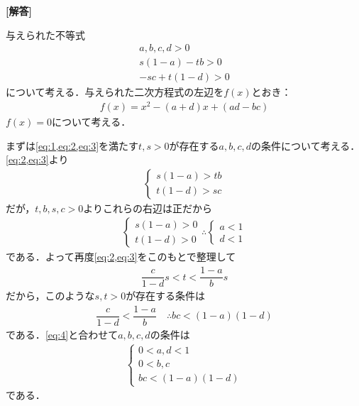 \documentclass[../../main.tex]{subfiles}
\begin{document}
\begin{oframed}
  
\end{oframed}

{\bf [解答]}

与えられた不等式
\begin{align}
  a,b,c,d > 0 \label{eq:1}\\
  s(1-a)-tb>0 \label{eq:2}\\
  -sc+t(1-d)>0 \label{eq:3}
\end{align}
について考える．与えられた二次方程式の左辺を$f(x)$とおき：
\begin{align}
  f(x) = x^2-(a+d)x+(ad-bc)
\end{align}
$f(x)=0$について考える．

まずは\cref{eq:1,eq:2,eq:3}を満たす$t,s>0$が存在する$a,b,c,d$の条件について考える．\cref{eq:2,eq:3}より
\begin{align}
  \begin{cases}
    s(1-a) > tb \\
    t(1-d) > sc
  \end{cases}
\end{align}
だが，$t,b,s,c>0$よりこれらの右辺は正だから
\begin{align}
  \begin{cases}
    s(1-a)>0 \\
    t(1-d)>0
  \end{cases}
  \therefore
  \begin{cases}
    a<1 \\
    d<1
  \end{cases} \label{eq:4}
\end{align}
である．よって再度\cref{eq:2,eq:3}をこのもとで整理して
\begin{align}
  \dfrac{c}{1-d}s < t < \dfrac{1-a}{b}s
\end{align}
だから，このような$s,t>0$が存在する条件は
\begin{align}
  \dfrac{c}{1-d} < \dfrac{1-a}{b} \quad \therefore bc < (1-a)(1-d) \label{eq:5}
\end{align}
である．\cref{eq:4}と合わせて$a,b,c,d$の条件は
\begin{align}
  \begin{cases}
    0<a,d<1 \\
    0<b,c \\
    bc < (1-a)(1-d)
  \end{cases} \label{eq:6}
\end{align}
である．
\end{document}
